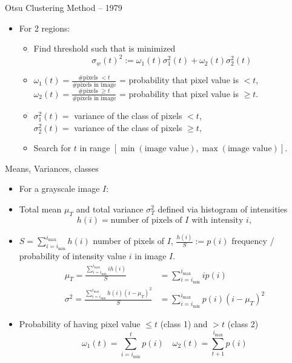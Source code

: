 \documentclass[9pt]{beamer}
\newcommand{\myemph}[1]{{\color{blue}{#1}}}
\begin{document}
\begin{frame}[t]{Otsu Clustering Method -- 1979}
  \begin{itemize}
  \item For 2 regions:\vfill
    \begin{itemize}
    \item Find threshold such that \myemph{intraclass variance} is minimized
      $$
      \sigma_w(t)^2 := \omega_1(t)\sigma_1^2(t) + \omega_2(t)\sigma_2^2(t)
      $$
      \vfill
    \item $\omega_1(t) = \frac{\# \text{pixels } < t}{\#\text{pixels in image}}$ =
      probability that pixel value is $<t$,
      $\omega_2(t) = \frac{\# \text{pixels } \geq t}{\#\text{pixels in image}}$ =
      probability that pixel value is $\geq t$.\vfill
    \item $\sigma_1^2(t) = $ variance of the class of pixels $< t$, \\
      $\sigma_2^2(t) = $ variance of the class of pixels $\geq t$, \vfill
    \item Search for $t$ in range $[\min(\text{image value}),\max(\text{image value})]$.
    \end{itemize}
    \vfill
  \end{itemize}
\end{frame}


\begin{frame}{Means, Variances, classes}
 
  \begin{itemize}[<+->]
  \item For a grayscale image $I$:
  \item Total mean $\mu_T$ and total variance $\sigma^2_T$ defined via histogram of intensities
    $$
    h(i) = \text{number of pixels of }I\text{ with intensity }i,
    $$
  \item $S = \sum_{i=i_{\min}}^{i_{\max}}h(i)$ number of pixels of $I$,
    $\frac{h(i)}{S} := p(i)$ frequency / probability of intensity value $i$ in image $I$.
    \begin{align*}
    \mu_T = \frac{\sum_{i=i_{\min}}^{i_{\max}} ih(i)}{S} &=\sum_{i=i_{\min}}^{i_{\max}} ip(i)\\
    \sigma^2 = \frac{\sum_{i=i_{\min}}^{i_{\max}} h(i)(i -\mu_T)^2}{S} &= \sum_{i=i_{\min}}^{i_{\max}} p(i)(i-\mu_T)^2
    \end{align*}
  \item Probability of having pixel value $\leq t$ (class 1) and $> t$ (class 2)
    $$
    \omega_1(t) = \sum_{i=i_{\min}}^t p(i)\quad \omega_2(t) = \sum_{t+1}^{i_{\max}} p(i)
    $$
  \end{itemize}
\end{frame}
\end{document}
